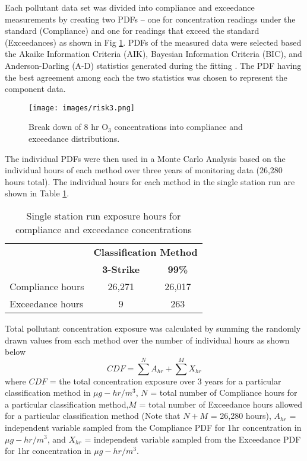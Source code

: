 Each pollutant data set was divided into compliance and exceedance measurements by creating two PDFs – one for concentration readings under the standard (Compliance) and one for readings that exceed the standard (Exceedances) as shown in Fig \ref{fig3:distributions}.  PDFs of the measured data were selected based the Akaike Information Criteria (AIK), Bayesian Information Criteria (BIC), and Anderson-Darling (A-D) statistics generated during the fitting \citep{Palisades2016}.  The PDF having the best agreement among each the two statistics was chosen to represent the component data.  
%  
\begin{figure}
\texttt{[image: images/risk3.png]} 
\caption{Break down of 8 hr O$_{3}$ concentrations into compliance and exceedance distributions.}
\label{fig3:distributions}
\end{figure}
%
The individual PDFs were then used in a Monte Carlo Analysis based on the individual hours of each method over three years of monitoring data (26,280 hours total).  The individual hours for each method in the single station run are shown in Table \ref{tb3:exphrs}. 
%
\begin{table}[!htb]
\centering
\caption{Single station run exposure hours for compliance and exceedance concentrations}
\label{tb3:exphrs}
\begin{tabular}{@{}lcc@{}}
\toprule
 & \multicolumn{2}{c}{\textbf{Classification Method}} \\ 
 & \textbf{3-Strike} & \textbf{99\%} \\ \midrule
Compliance hours & 26,271 & 26,017 \\
Exceedance hours & 9 & 263 \\ \bottomrule
\end{tabular}
\end{table}
%
Total pollutant concentration exposure was calculated by summing the randomly drawn values from each method over the number of individual hours as shown below
%
\begin{equation}
\label{eq3:cdfsum}
CDF=\sum^{N}A_{hr} + \sum^{M}X_{hr}
\end{equation}
%
\noindent
where 	$CDF$ = the total concentration exposure over 3 years for a particular classification method in $\mu g-hr/m^{3}$, $N$ = total number of Compliance hours for a particular classification method,$M$ = total number of Exceedance hours allowed for a particular classification method (Note that $N + M$ = 26,280 hours), $A_{hr}$ = independent variable sampled from the Compliance PDF for 1hr concentration in $\mu g-hr/m^{3}$, and $X_{hr}$ = independent variable sampled from the Exceedance PDF for 1hr concentration in $\mu g-hr/m^{3}$.

